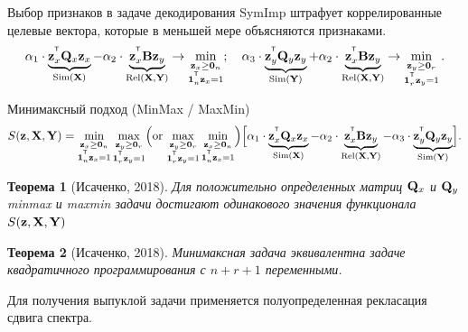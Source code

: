 \documentclass[10pt]{beamer}
\newtheorem{rustheorem}{Теорема}
\begin{document}
\begin{frame}{Выбор признаков в задаче декодирования}
	SymImp штрафует коррелированные целевые вектора, которые в меньшей мере объясняются признаками. 
	\[
	\alpha_1 \cdot \underbrace{\bz_x^{\T} \bQ_x \bz_x}_{\text{Sim}(\bX)} - \alpha_2 \cdot \underbrace{\vphantom{()} \bz_x^{\T}\mathbf{B} \bz_y}_{\text{Rel}(\bX, \bY)} \rightarrow \min_{\substack{\bz_x \geq \bZero_n \\ \bOne_n^{\T}\bz_x=1}}; \quad
	\alpha_3 \cdot \underbrace{\bz_y^{\T} \bQ_y \bz_y}_{\text{Sim}(\bY)} + \alpha_2 \cdot \underbrace{\vphantom{()} \bz_x^{\T} \mathbf{B} \bz_y}_{\text{Rel}(\bX, \bY)} \rightarrow \min_{\substack{\bz_y \geq \bZero_r  \\ \bOne_r^{\T}\bz_y=1}}.
	\]
	\vspace{-0.3cm}
	\begin{block}{Минимаксный подход (MinMax / MaxMin)}
	\vspace{-0.6cm}
	\[
	S(\bz, \bX, \bY) = \min_{\substack{\bz_x \geq \bZero_n \\ \bOne_n^{\T}\bz_x=1}} 	\max_{\substack{\bz_y \geq \bZero_r \\ \bOne_r^{\T}\bz_y=1}} \Bigl(\text {or} \, \max_{\substack{\bz_y \geq \bZero_r \\ \bOne_r^{\T}\bz_y=1}} \min_{\substack{\bz_x \geq \bZero_n \\ \bOne_n^{\T}\bz_x=1}}\Bigr) \Bigl[\alpha_1 \cdot \underbrace{\bz_x^{\T} \bQ_x \bz_x}_{\text{Sim}(\bX)} - \alpha_2 \cdot \underbrace{\bz_x^{\T} \bB \bz_y}_{\text{Rel}(\bX, \bY)} - \alpha_3 \cdot \underbrace{\bz_y^{\T} \bQ_y \bz_y}_{\text{Sim}(\bY)}\Bigr].
	\]
	\end{block}
	\vspace{-0.4cm}
	\begin{rustheorem}[Исаченко, 2018]
		Для положительно определенных матриц $\bQ_x$ и $\bQ_y$ minmax и maxmin задачи достигают одинакового значения функционала $S(\bz, \bX, \bY)$
	\end{rustheorem}
	\vspace{-0.2cm}
	\begin{rustheorem}[Исаченко, 2018]
		Минимаксная задача эквивалентна задаче квадратичного программирования с $n + r + 1$ переменными.
	\end{rustheorem}
	Для получения выпуклой задачи применяется полуопределенная рекласация сдвига спектра.

\end{frame}
\end{document}

